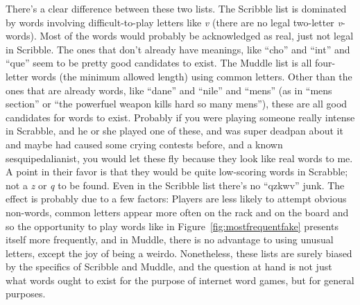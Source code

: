 \documentclass[twocolumn]{article}
\begin{document}
There's a clear difference between these two lists. The Scribble list
is dominated by words involving difficult-to-play letters like {\it v}
(there are no legal two-letter {\it v}-words). Most of the words would
probably be acknowledged as real, just not legal in Scribble. The ones
that don't already have meanings, like ``cho'' and ``int'' and ``que''
seem to be pretty good candidates to exist. The Muddle list is all
four-letter words (the minimum allowed length) using common letters.
Other than the ones that are already words, like ``dane'' and ``nile''
and ``mens'' (as in ``mens section'' or ``the powerfuel weapon kills
hard so many mens''), these are all good candidates for words to
exist. Probably if you were playing someone really intense in
Scrabble, and he or she played one of these, and was super deadpan
about it and maybe had caused some crying contests before, and a known
sesquipedalianist, you would let these fly because they look like real
words to me. A point in their favor is that they would be quite
low-scoring words in Scrabble; not a {\it z} or {\it q} to be found.
Even in the Scribble list there's no ``qzkwv'' junk. The effect is
probably due to a few factors: Players are less likely to attempt
obvious non-words, common letters appear more often on the rack and on
the board and so the opportunity to play words like in
Figure~\ref{fig:mostfrequentfake} presents itself more frequently, and
in Muddle, there is no advantage to using unusual letters, except the
joy of being a weirdo. Nonetheless, these lists are surely biased by
the specifics of Scribble and Muddle, and the question at hand is not
just what words ought to exist for the purpose of internet word games,
but for general purposes.
\end{document}
